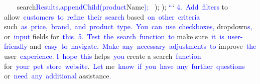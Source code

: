 \documentclass{article}
\begin{document}
\begin{tcolorbox}[colframe=black,colback=white]
{{{}\textcolor{blue}{~~~} search\textcolor{blue}{Results}\textcolor{blue}{.appendChild}\textcolor{blue}{(product}Name\textcolor{blue}{);
} \textcolor{blue}{~});
}\textcolor{blue}{});
}\textcolor{blue}{``}`
\textcolor{blue}{4}\textcolor{blue}{.}\textcolor{blue}{~Add}\textcolor{blue}{~filters} to allow\textcolor{blue}{~customers}\textcolor{blue}{~to}\textcolor{blue}{~refine}\textcolor{blue}{~their}\textcolor{blue}{~search} based\textcolor{blue}{~on}\textcolor{blue}{~other}\textcolor{blue}{~criteria} such\textcolor{blue}{~as}\textcolor{blue}{~price}\textcolor{blue}{,}\textcolor{blue}{~brand}\textcolor{blue}{,}\textcolor{blue}{~and}\textcolor{blue}{~product}\textcolor{blue}{~type}.\textcolor{blue}{~You}\textcolor{blue}{~can}\textcolor{blue}{~use}\textcolor{blue}{~checkboxes}\textcolor{blue}{,} dropdown\textcolor{blue}{s}\textcolor{blue}{,} or\textcolor{blue}{~input} fields for\textcolor{blue}{~this}\textcolor{blue}{.
}\textcolor{blue}{5}\textcolor{blue}{.}\textcolor{blue}{~Test}\textcolor{blue}{~the}\textcolor{blue}{~search}\textcolor{blue}{~function}\textcolor{blue}{~to} make sure\textcolor{blue}{~it}\textcolor{blue}{~is}\textcolor{blue}{~user}\textcolor{blue}{-friendly} and\textcolor{blue}{~easy}\textcolor{blue}{~to}\textcolor{blue}{~navigate}\textcolor{blue}{.}\textcolor{blue}{~Make}\textcolor{blue}{~any}\textcolor{blue}{~necessary}\textcolor{blue}{~adjustments}\textcolor{blue}{~to} improve\textcolor{blue}{~the} user\textcolor{blue}{~experience}.
\textcolor{blue}{I}\textcolor{blue}{~hope}\textcolor{blue}{~this} helps\textcolor{blue}{~you} create a search\textcolor{blue}{~function} for\textcolor{blue}{~your}\textcolor{blue}{~pet}\textcolor{blue}{~store}\textcolor{blue}{~website}.\textcolor{blue}{~Let} me\textcolor{blue}{~know}\textcolor{blue}{~if}\textcolor{blue}{~you}\textcolor{blue}{~have}\textcolor{blue}{~any}\textcolor{blue}{~further}\textcolor{blue}{~questions} or\textcolor{blue}{~need}\textcolor{blue}{~any}\textcolor{blue}{~additional} assistance\textcolor{blue}{.}\textcolor{blue}{}
\end{tcolorbox}
\end{document}
